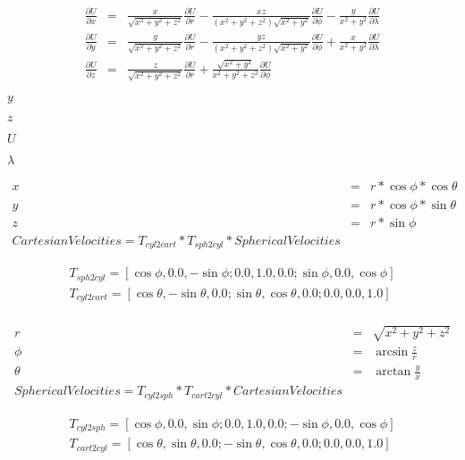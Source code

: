\documentclass{article}
\begin{document}
\begin{eqnarray*} \frac{ \partial U }{ \partial x } & = & \frac{ x }{ \sqrt{ x^2 + y^2 +z^2 } } \frac{ \partial U }{ \partial r } - \frac{ x z }{ ( x^2 + y^2 +z^2 ) \sqrt{ x^2 + y^2 } } \frac{ \partial U }{ \partial \phi } - \frac{ y }{ x^2 + y^2 } \frac{ \partial U }{ \partial \lambda } \\ \frac{ \partial U }{ \partial y } & = & \frac{ y }{ \sqrt{ x^2 + y^2 +z^2 } } \frac{ \partial U }{ \partial r } - \frac{ y z }{ ( x^2 + y^2 +z^2 ) \sqrt{ x^2 + y^2 } } \frac{ \partial U }{ \partial \phi } + \frac{ x }{ x^2 + y^2 } \frac{ \partial U }{ \partial \lambda } \\ \frac{ \partial U }{ \partial z } & = & \frac{ z }{ \sqrt{ x^2 + y^2 +z^2 } } \frac{ \partial U }{ \partial r } + \frac{ \sqrt{ x^2 + y^2 } } { x^2 + y^2 +z^2 } \frac{ \partial U }{ \partial \phi } \end{eqnarray*}
\pagebreak

$ y $
\pagebreak

$ z $
\pagebreak

$ U $
\pagebreak

$ \lambda $
\pagebreak

\begin{eqnarray*} x &=& r * \cos \phi * \cos \theta\\ y &=& r * \cos \phi * \sin \theta\\ z &=& r * \sin \phi\\ CartesianVelocities = T_{cyl2cart}*T_{sph2cyl}*SphericalVelocities \end{eqnarray*}
\pagebreak

\begin{eqnarray*} T_{sph2cyl} = [ \cos\phi , 0.0 , -\sin \phi ; 0.0 , 1.0 , 0.0 ; \sin\phi , 0.0 , \cos\phi ]\\ T_{cyl2cart} = [ \cos\theta , -\sin\theta , 0.0 ; \sin\theta , \cos\theta , 0.0 ; 0.0 , 0.0 , 1.0 ]\\ \end{eqnarray*}
\pagebreak

\begin{eqnarray*} r &=& \sqrt{ x^{ 2 } + y^{ 2 } + z^{ 2 } } \\ \phi &=& \arcsin\frac{ z }{ r } \\ \theta &=& \arctan\frac{ y }{ x } \\ SphericalVelocities = T_{cyl2sph}*T_{cart2cyl}*CartesianVelocities \end{eqnarray*}
\pagebreak

\begin{eqnarray*} T_{cyl2sph} = [ \cos\phi , 0.0 , \sin \phi ; 0.0 , 1.0 , 0.0 ; -\sin\phi , 0.0 , \cos\phi ]\\ T_{cart2cyl} = [ \cos\theta , \sin\theta , 0.0 ; -\sin\theta , \cos\theta , 0.0 ; 0.0 , 0.0 , 1.0 ]\\ \end{eqnarray*}
\pagebreak
\end{document}

